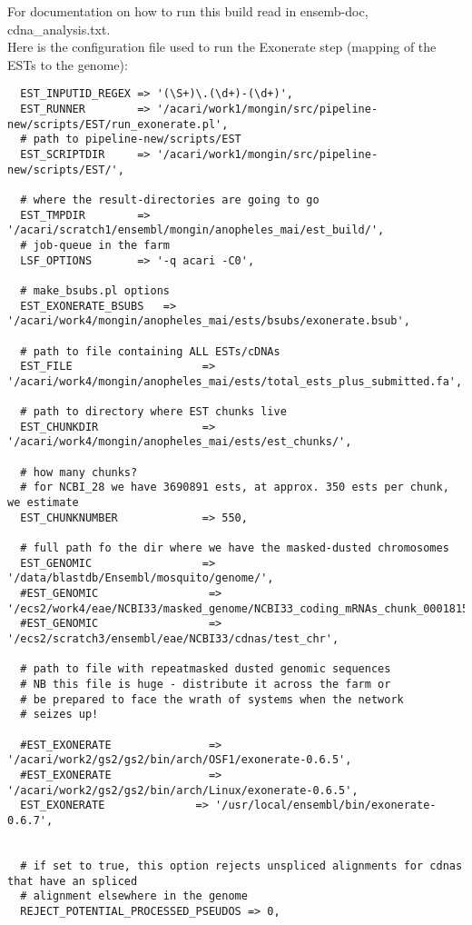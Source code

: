 \documentclass[a4paper,10pt]{article}
\begin{document}
For documentation on how to run this build read in ensemb-doc, cdna_analysis.txt.
\\
Here is the configuration file used to run the Exonerate step (mapping of the ESTs to the genome):

\begin{verbatim}
  EST_INPUTID_REGEX => '(\S+)\.(\d+)-(\d+)',
  EST_RUNNER        => '/acari/work1/mongin/src/pipeline-new/scripts/EST/run_exonerate.pl', 	   
  # path to pipeline-new/scripts/EST
  EST_SCRIPTDIR     => '/acari/work1/mongin/src/pipeline-new/scripts/EST/',
	      
  # where the result-directories are going to go	
  EST_TMPDIR        => '/acari/scratch1/ensembl/mongin/anopheles_mai/est_build/',	      
  # job-queue in the farm
  LSF_OPTIONS       => '-q acari -C0',
  
  # make_bsubs.pl options
  EST_EXONERATE_BSUBS   => '/acari/work4/mongin/anopheles_mai/ests/bsubs/exonerate.bsub',
  
  # path to file containing ALL ESTs/cDNAs
  EST_FILE                    => '/acari/work4/mongin/anopheles_mai/ests/total_ests_plus_submitted.fa',
  
  # path to directory where EST chunks live
  EST_CHUNKDIR                => '/acari/work4/mongin/anopheles_mai/ests/est_chunks/',
  
  # how many chunks?
  # for NCBI_28 we have 3690891 ests, at approx. 350 ests per chunk, we estimate
  EST_CHUNKNUMBER             => 550, 	 
  	      
  # full path fo the dir where we have the masked-dusted chromosomes
  EST_GENOMIC                 => '/data/blastdb/Ensembl/mosquito/genome/',
  #EST_GENOMIC                 => '/ecs2/work4/eae/NCBI33/masked_genome/NCBI33_coding_mRNAs_chunk_0001815/',
  #EST_GENOMIC                 => '/ecs2/scratch3/ensembl/eae/NCBI33/cdnas/test_chr',
  
  # path to file with repeatmasked dusted genomic sequences
  # NB this file is huge - distribute it across the farm or 
  # be prepared to face the wrath of systems when the network 
  # seizes up!
  
  #EST_EXONERATE               => '/acari/work2/gs2/gs2/bin/arch/OSF1/exonerate-0.6.5',
  #EST_EXONERATE               => '/acari/work2/gs2/gs2/bin/arch/Linux/exonerate-0.6.5',
  EST_EXONERATE              => '/usr/local/ensembl/bin/exonerate-0.6.7',
  
  
  # if set to true, this option rejects unspliced alignments for cdnas that have an spliced
  # alignment elsewhere in the genome
  REJECT_POTENTIAL_PROCESSED_PSEUDOS => 0,
  

\end{verbatim}
\end{document}
